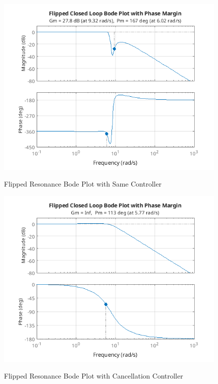 \documentclass{article}
\begin{document}
\begin{figure}[H]
    \centering
    \includegraphics[width=\textwidth]{flippedSameControllerPlot.png}
    \label{fig:flippedSameControllerPlot}
    \caption{Flipped Resonance Bode Plot with Same Controller}
\end{figure}

\begin{figure}[H]
    \centering
    \includegraphics[width=\textwidth]{flippedCancelledPlot.png}
    \label{fig:flippedCancelledPlot}
    \caption{Flipped Resonance Bode Plot with Cancellation Controller}
\end{figure}
\end{document}
